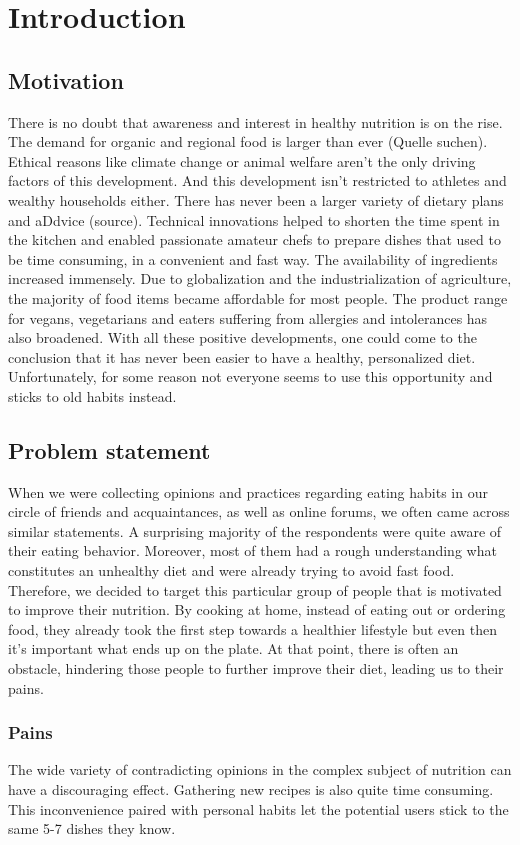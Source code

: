 \chapter{Introduction}
\section{Motivation}
There is no doubt that awareness and interest in healthy nutrition is on the rise. The demand for organic and regional food is larger than ever (Quelle suchen). Ethical reasons like climate change or animal welfare aren’t the only driving factors of this development. And this development isn’t restricted to athletes and wealthy households either. There has never been a larger variety of dietary plans and aDdvice (source). Technical innovations helped to shorten the time spent in the kitchen and enabled passionate amateur chefs to prepare dishes that used to be time consuming, in a convenient and fast way. The availability of ingredients increased immensely. Due to globalization and the industrialization of agriculture, the majority of food items became affordable for most people. The product range for vegans, vegetarians and eaters suffering from allergies and intolerances has also broadened. With all these positive developments, one could come to the conclusion that it has never been easier to have a healthy, personalized diet. Unfortunately, for some reason not everyone seems to use this opportunity and sticks to old habits instead.
\section{Problem statement}
When we were collecting opinions and practices regarding eating habits in our circle of friends and acquaintances, as well as online forums, we often came across similar statements. A surprising majority of the respondents were quite aware of their eating behavior. Moreover, most of them had a rough understanding what constitutes an unhealthy diet and were already trying to avoid fast food. Therefore, we decided to target this particular group of people that is motivated to improve their nutrition. By cooking at home, instead of eating out or ordering food, they already took the first step towards a healthier lifestyle but even then it’s important what ends up on the plate. At that point, there is often an obstacle, hindering those people to further improve their diet, leading us to their  pains.

\subsection*{Pains}
The wide variety of contradicting opinions in the complex subject of nutrition can have a discouraging effect. Gathering new recipes is also quite time consuming. This inconvenience paired with personal habits let the potential users stick to the same 5-7 dishes they know.

